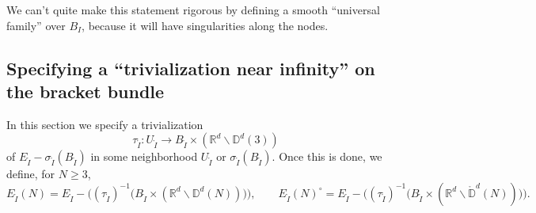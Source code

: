 \documentclass[11pt]{article}
\theoremstyle{definition}
\theoremstyle{remark}
\def\mr#1{{\mathring{#1}}}
\def\R{\mathbb{R}}
\def\D{\mathbb{D}}
\def\cA{\mathcal{A}}
\def\rI{{\mathring{I}}}
\def\cmt#1{\textcolor{purple}{(#1)}}
\def\pr{{\textnormal{pr}}}
\begin{document}
We can't quite make this statement rigorous by defining a smooth ``universal family'' over $B_I$, because it will have singularities along the nodes. 



%
%
%
%
%





\subsection{Specifying a ``trivialization near infinity'' on the bracket bundle}
\label{tauEI_subsec}

In this section we specify a trivialization 
$$\tau_\rI: U_\rI\longrightarrow B_\rI\times(\R^d\backslash\D^d(3))$$
of $E_\rI-\sigma_\rI(B_\rI)$ in some neighborhood $U_\rI$ or $\sigma_\rI(B_\rI)$. 
Once this is done, we define, for $N\ge3$, 
$$E_\rI(N)=E_\rI-\Big((\tau_\rI)^{-1}\big(B_\rI\times(\R^d\backslash\D^d(N))\big)\Big),\qquad E_\rI(N)^\circ=E_\rI-\Big((\tau_\rI)^{-1}\big(B_\rI\times(\R^d\backslash\mr\D^d(N))\big)\Big).$$

\end{document}
